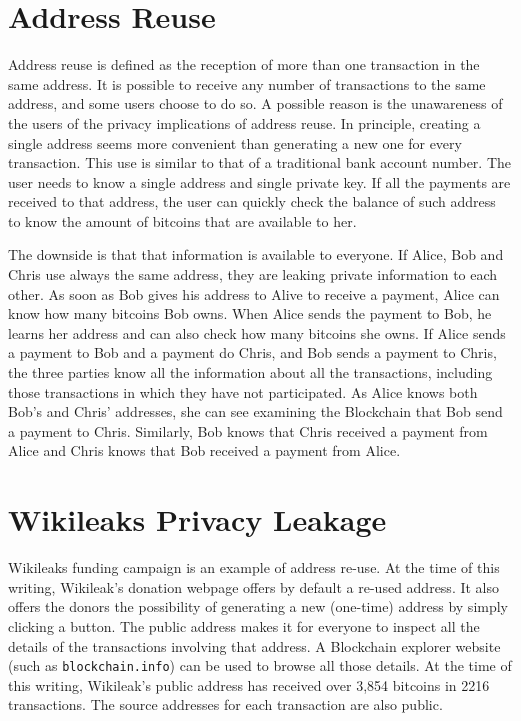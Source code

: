 \documentclass[journal]{IEEEtran}
\begin{document}
\section{Address Reuse}

Address reuse is defined as the reception of more than one transaction in the same address.
It is possible to receive any number of transactions to the same address, and some users choose to do so.
A possible reason is the unawareness of the users of the privacy implications of address reuse.
In principle, creating a single address seems more convenient than generating a new one for every transaction.
This use is similar to that of a traditional bank account number.
The user needs to know a single address and single private key.
If all the payments are received to that address, the user can quickly check the balance of such address to know the amount of bitcoins that are available to her.

The downside is that that information is available to everyone.
If Alice, Bob and Chris use always the same address, they are leaking private information to each other.
As soon as Bob gives his address to Alive to receive a payment, Alice can know how many bitcoins Bob owns.
When Alice sends the payment to Bob, he learns her address and can also check how many bitcoins she owns.
If Alice sends a payment to Bob and a payment do Chris, and Bob sends a payment to Chris, the three parties know all the information about all the transactions, including those transactions in which they have not participated.
As Alice knows both Bob's and Chris' addresses, she can see examining the Blockchain that Bob send a payment to Chris.
Similarly, Bob knows that Chris received a payment from Alice and Chris knows that Bob received a payment from Alice.

\section{Wikileaks Privacy Leakage}

Wikileaks funding campaign is an example of address re-use.
At the time of this writing, Wikileak's donation webpage offers by default a re-used address.
It also offers the donors the possibility of generating a new (one-time) address by simply clicking a button.
The public address makes it for everyone to inspect all the details of the transactions involving that address.
A Blockchain explorer website (such as \texttt{blockchain.info}) can be used to browse all those details.
At the time of this writing, Wikileak's public address has received over 3,854 bitcoins in 2216 transactions.
The source addresses for each transaction are also public.
\end{document}
